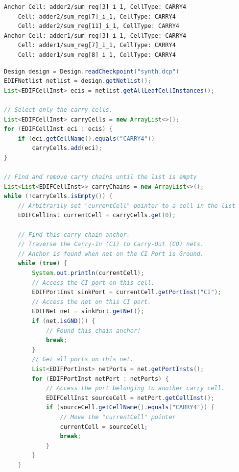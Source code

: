 \begin{multicols}{2}


\begin{lstlisting}[caption={Code Printout}]
Anchor Cell: adder2/sum_reg[3]_i_1, CellType: CARRY4
	Cell: adder2/sum_reg[7]_i_1, CellType: CARRY4
	Cell: adder2/sum_reg[11]_i_1, CellType: CARRY4
Anchor Cell: adder1/sum_reg[3]_i_1, CellType: CARRY4
	Cell: adder1/sum_reg[7]_i_1, CellType: CARRY4
	Cell: adder1/sum_reg[8]_i_1, CellType: CARRY4
\end{lstlisting}


\begin{lstlisting}[language=java, caption={Finding and storing carry chains.}, label={lst:carry_chains}]
Design design = Design.readCheckpoint("synth.dcp")
EDIFNetlist netlist = design.getNetlist();
List<EDIFCellInst> ecis = netlist.getAllLeafCellInstances();

// Select only the carry cells.
List<EDIFCellInst> carryCells = new ArrayList<>();
for (EDIFCellInst eci : ecis) {
    if (eci.getCellName().equals("CARRY4"))
        carryCells.add(eci);
}

// Find and remove carry chains until the list is empty
List<List<EDIFCellInst>> carryChains = new ArrayList<>();
while (!carryCells.isEmpty()) {
    // Arbitrarily set "currentCell" pointer to a cell in the list
    EDIFCellInst currentCell = carryCells.get(0);

    // Find this carry chain anchor.
    // Traverse the Carry-In (CI) to Carry-Out (CO) nets.
    // Anchor is found when net on the CI Port is Ground.
    while (true) {
        System.out.println(currentCell);
        // Access the CI port on this cell.
        EDIFPortInst sinkPort = currentCell.getPortInst("CI");
        // Access the net on this CI port.
        EDIFNet net = sinkPort.getNet();
        if (net.isGND()) {
            // Found this chain anchor!
            break;
        }
        // Get all ports on this net.
        List<EDIFPortInst> netPorts = net.getPortInsts();
        for (EDIFPortInst netPort : netPorts) {
            // Access the port belonging to another carry cell.
            EDIFCellInst sourceCell = netPort.getCellInst();
            if (sourceCell.getCellName().equals("CARRY4")) {
                // Move the "currentCell" pointer
                currentCell = sourceCell;
                break;
            }
        }
    }




\end{lstlisting}
\end{multicols}
